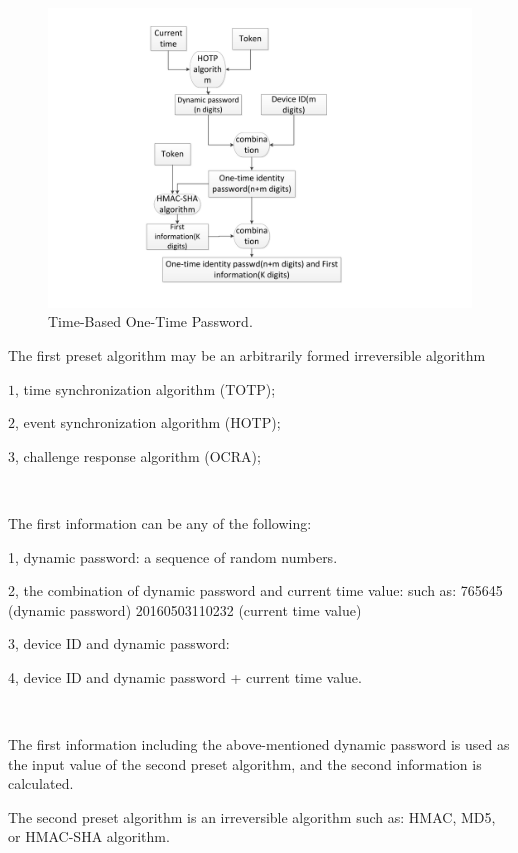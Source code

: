 \documentclass[journal]{IEEEtran}
\begin{document}
\begin{figure}[htbp]
\centerline{\includegraphics[scale=0.55]{TOTP.pdf}}
\caption{Time-Based One-Time Password.}
\label{fig}
\end{figure}



The first preset algorithm may be an arbitrarily formed irreversible algorithm
                           
                           $1$, time synchronization algorithm (TOTP);
 
                           $2$, event synchronization algorithm (HOTP);

                           $3$, challenge response algorithm (OCRA);

\


The first information can be any of the following:

1, dynamic password: a sequence of random numbers.

2, the combination of dynamic password and current time value: such as: 765645 (dynamic password) 20160503110232 (current time value)

3, device ID and dynamic password:

4, device ID and dynamic password + current time value.

\

The first information including the above-mentioned dynamic password is used as the input value of the second preset algorithm, and the second information is calculated.

The second preset algorithm is an irreversible algorithm such as: HMAC, MD5, or HMAC-SHA algorithm.
\end{document}
